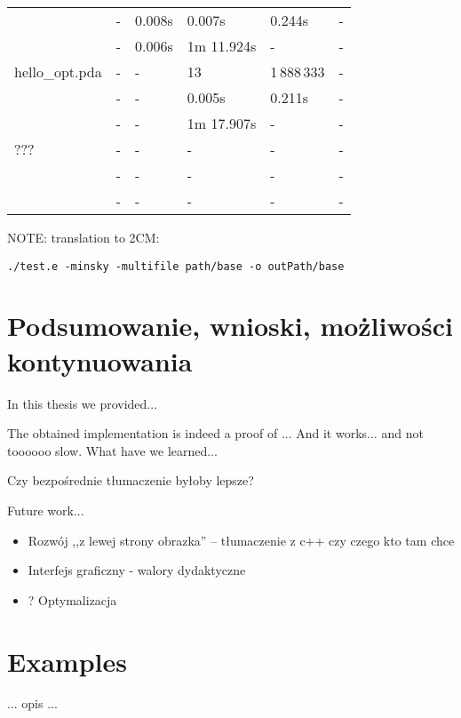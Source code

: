 \documentclass[english,shortabstract,mgr]{iithesis}
\begin{document}
\begin{table}[]
\begin{center}
\begin{tabular}{llllll}
 & - & 0.008s & 0.007s & 0.244s & - \\
 & - & 0.006s & 1m 11.924s & - & - \\
\hline
hello\_opt.pda & - & - & 13 & 1\,888\,333 & -\\
 & - & - & 0.005s & 0.211s & - \\
 & - & - & 1m 17.907s & - & - \\
\hline
??? & - & - & - & - & -\\
 & - & - & - & - & - \\
 & - & - & - & - & - \\
\end{tabular}
\end{center}
\end{table}

NOTE: translation to 2CM:

\texttt{./test.e -minsky -multifile path/base -o outPath/base}

\chapter{Podsumowanie, wnioski, możliwości kontynuowania}


In this thesis we provided...

The obtained implementation is indeed a proof of ... And it works... and not toooooo slow. What have we learned...

Czy bezpośrednie tłumaczenie byłoby lepsze?


Future work...
\begin{itemize}
\item 
Rozwój ,,z lewej strony obrazka'' -- tłumaczenie z c++ czy czego kto tam chce
\item 
Interfejs graficzny - walory dydaktyczne
\item 
? Optymalizacja
\end{itemize}


{}

\newpage
\appendix

\chapter{Examples}

... opis ...
\end{document}
